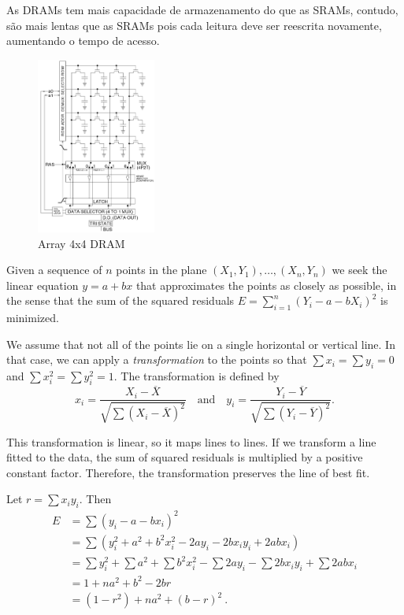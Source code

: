 \documentclass{article}
\begin{document}
As DRAMs tem mais capacidade de armazenamento do que as SRAMs, contudo, são mais lentas que as SRAMs pois cada leitura deve ser reescrita novamente, aumentando o tempo de acesso.

\begin{figure}[h!] 
    \centering 
    \includegraphics[width=0.35\textwidth]{Dram4x4.png}
    \caption{Array 4x4 DRAM} 
    \label{fig:DRam4x4} 
\end{figure}
\iffalse
Given a sequence of $n$ points in the plane $(X_1, Y_1), \ldots, (X_n, Y_n)$
we seek the linear equation $y = a + bx$ that approximates the points
as closely as possible, in the sense that the sum of the squared residuals
$E = \sum_{i=1}^n (Y_i - a - bX_i)^2$ is minimized.

We assume that not all of the points lie on a single horizontal or vertical
line. In that case, we can apply a \emph{transformation} to the points
so that $\sum x_i = \sum y_i = 0$ and $\sum x_i^2 = \sum y_i^2 = 1$.
The transformation is defined by
$$
x_i = \frac{X_i - \overline{X}}{\sqrt{\sum (X_i - \overline{X})^2}}\quad\text{and}\quad
y_i = \frac{Y_i - \overline{Y}}{\sqrt{\sum (Y_i - \overline{Y})^2}}.
$$

This transformation is linear, so it maps lines to lines.
If we transform a line fitted to the data,
the sum of squared residuals is multiplied by a positive constant factor.
Therefore, the transformation preserves the line of best fit.


Let $r = \sum x_i y_i$. Then
\begin{align*}
E &= \sum (y_i - a - bx_i)^2 \\
&= \sum (y_i^2 + a^2 + b^2 x_i^2 - 2ay_i - 2bx_iy_i + 2abx_i) \\
&= \sum y_i^2 + \sum a^2 + \sum b^2 x_i^2 
 - \sum 2ay_i - \sum 2bx_iy_i + \sum 2abx_i \\
&= 1 + na^2 + b^2 - 2br \\
&= (1-r^2) + na^2 + (b - r)^2\ .
\end{align*}
\end{document}
